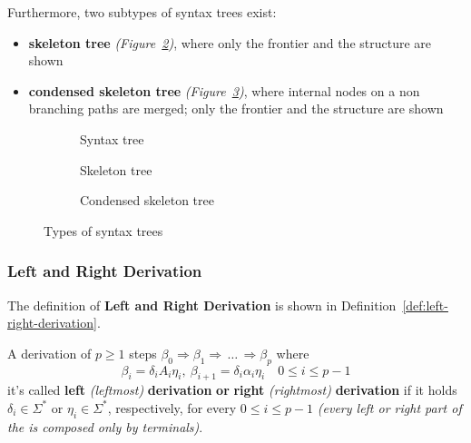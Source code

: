 \documentclass[english]{article}
\begin{document}
Furthermore, two subtypes of syntax trees exist:

\begin{itemize}
  \item \textbf{skeleton tree} \textit{(Figure~\ref{subfig:skeleton-tree})}, where only the frontier and the structure are shown
  \item \textbf{condensed skeleton tree} \textit{(Figure~\ref{subfig:condensed-skeleton-tree})}, where internal nodes on a non branching paths are merged; only the frontier and the structure are shown
\end{itemize}

\begin{figure}[htbp]
  \bigskip
  \centering
  \begin{subfigure}[t]{0.99\textwidth}
    \bigskip
    \centering
    \caption{Syntax tree}
    \label{subfig:syntax-tree}
    \bigskip
  \end{subfigure}
  \bigskip
  \begin{subfigure}[t]{0.495\textwidth}
    \bigskip
    \centering
    \caption{Skeleton tree}
    \label{subfig:skeleton-tree}
    \bigskip
  \end{subfigure}
  \begin{subfigure}[t]{0.495\textwidth}
    \bigskip
    \centering
        \caption{Condensed skeleton tree}
    \label{subfig:condensed-skeleton-tree}
    \bigskip
  \end{subfigure}

  \caption{Types of syntax trees}
  \label{fig:types-of-syntax-trees}
\end{figure}

\subsubsection{Left and Right Derivation}
\label{sec:left-right-derivation}

The definition of \textbf{Left and Right Derivation} is shown in Definition~\ref{def:left-right-derivation}.

\begin{definition}
  \label{def:left-right-derivation}
  A derivation of \(p \geq 1\) steps \(\beta_0 \Rightarrow \beta_1 \Rightarrow \,\ldots\, \Rightarrow \beta_p\) where
  \[ \beta_i = \delta_i A_i \eta_i, \ \beta_{i+1} = \delta_i \alpha_i \eta_i \quad 0 \leq i \leq p-1 \]
  it's called \textbf{left} \textit{(leftmost)} \textbf{derivation} \textbf{or} \textbf{right} \textit{(rightmost)} \textbf{derivation} if it holds \(\delta_i \in \Sigma^\ast\) or \(\eta_i \in \Sigma^\ast\), respectively, for every \(0 \leq i \leq p-1\) \textit{(every left or right part of the \RP is composed only by terminals)}.
\end{definition}
\end{document}
